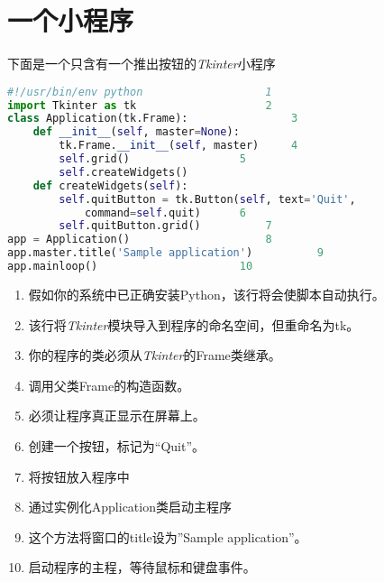 \thispagestyle{fancy}
\chapter[一个小程序]{一个小程序}
下面是一个只含有一个推出按钮的\textit{Tkinter}小程序
\begin{lstlisting}[language=python]
#!/usr/bin/env python					1
import Tkinter as tk 					2
class Application(tk.Frame): 				3
	def __init__(self, master=None):	
		tk.Frame.__init__(self, master) 	4
		self.grid() 				5
		self.createWidgets()
	def createWidgets(self):
		self.quitButton = tk.Button(self, text='Quit',
			command=self.quit) 		6
		self.quitButton.grid() 			7
app = Application() 					8
app.master.title('Sample application') 			9
app.mainloop()						10
\end{lstlisting}
\begin{enumerate}
\item %
假如你的系统中已正确安装Python，该行将会使脚本自动执行。
\item %
该行将\textit{Tkinter}模块导入到程序的命名空间，但重命名为tk。
\item %
你的程序的类必须从\textit{Tkinter}的Frame类继承。
\item %
调用父类Frame的构造函数。
\item %
必须让程序真正显示在屏幕上。
\item %
创建一个按钮，标记为“Quit”。
\item %
将按钮放入程序中
\item %
通过实例化Application类启动主程序
\item %
这个方法将窗口的title设为''Sample application''。
\item %
启动程序的主程，等待鼠标和键盘事件。

\end{enumerate}
